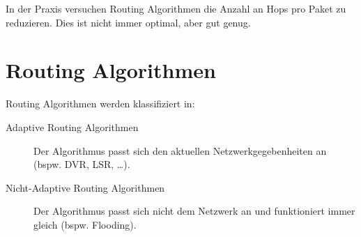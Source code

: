\documentclass[a4paper, 11pt, accentcolor = tud3b]{tudreport}
\begin{document}
            In der Praxis versuchen Routing Algorithmen die Anzahl an Hops pro Paket zu reduzieren. Dies ist nicht immer optimal, aber gut genug.

        \section{Routing Algorithmen}
            Routing Algorithmen werden klassifiziert in:
            \begin{description}
            	\item[Adaptive Routing Algorithmen] Der Algorithmus passt sich den aktuellen Netzwerkgegebenheiten an (bspw. DVR, LSR, \dots).
            	\item[Nicht-Adaptive Routing Algorithmen] Der Algorithmus passt sich nicht dem Netzwerk an und funktioniert immer gleich (bspw. Flooding).
            \end{description}
            
\end{document}
